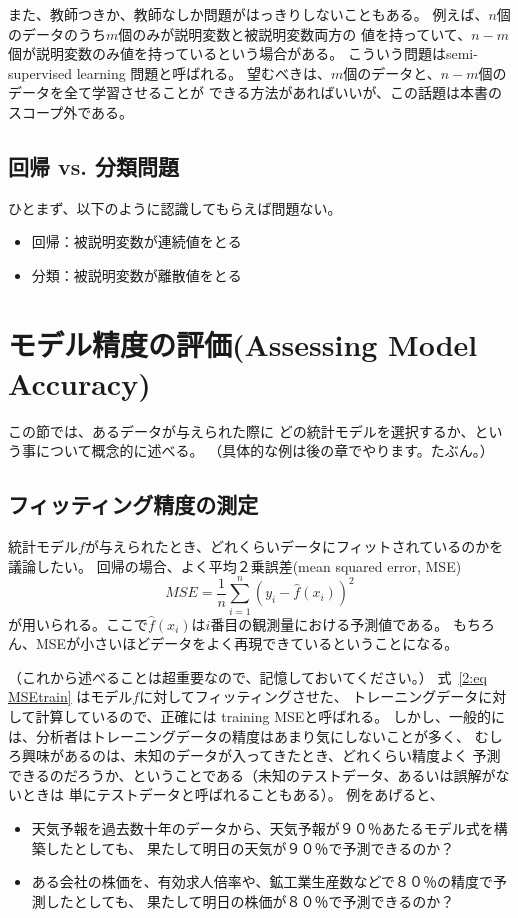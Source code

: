 \documentclass{jsbook}
\begin{document}
また、教師つきか、教師なしか問題がはっきりしないこともある。
例えば、$n$個のデータのうち$m$個のみが説明変数と被説明変数両方の
値を持っていて、$n-m$個が説明変数のみ値を持っているという場合がある。
こういう問題はsemi-supervised learning 問題と呼ばれる。
望むべきは、$m$個のデータと、$n-m$個のデータを全て学習させることが
できる方法があればいいが、この話題は本書のスコープ外である。

\subsection{回帰 vs. 分類問題}
ひとまず、以下のように認識してもらえば問題ない。
\begin{itemize}
\item 回帰：被説明変数が連続値をとる
\item 分類：被説明変数が離散値をとる
\end{itemize}

\section{モデル精度の評価(Assessing Model Accuracy)}
この節では、あるデータが与えられた際に
どの統計モデルを選択するか、という事について概念的に述べる。
（具体的な例は後の章でやります。たぶん。）

\subsection{フィッティング精度の測定}
統計モデル$f$が与えられたとき、どれくらいデータにフィットされているのかを
議論したい。
回帰の場合、よく平均２乗誤差(mean squared error, MSE)
\begin{equation}
MSE = \frac{1}{n} \sum_{i=1}^n (y_i - \hat{f}(x_i))^2 \label{2:eq MSEtrain}
\end{equation}
が用いられる。ここで$\hat{f}(x_i)$は$i$番目の観測量における予測値である。
もちろん、MSEが小さいほどデータをよく再現できているということになる。

（これから述べることは超重要なので、記憶しておいてください。）
式~\eqref{2:eq MSEtrain} はモデル$f$に対してフィッティングさせた、
トレーニングデータに対して計算しているので、正確には
training MSEと呼ばれる。
しかし、一般的には、分析者はトレーニングデータの精度はあまり気にしないことが多く、
むしろ興味があるのは、未知のデータが入ってきたとき、どれくらい精度よく
予測できるのだろうか、ということである（未知のテストデータ、あるいは誤解がないときは
単にテストデータと呼ばれることもある）。
例をあげると、
\begin{itemize}
\item 天気予報を過去数十年のデータから、天気予報が９０％あたるモデル式を構築したとしても、
果たして明日の天気が９０％で予測できるのか？
\item ある会社の株価を、有効求人倍率や、鉱工業生産数などで８０％の精度で予測したとしても、
果たして明日の株価が８０％で予測できるのか？
\end{itemize}
\end{document}

